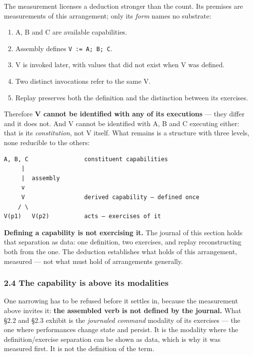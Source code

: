 \documentclass[
]{article}
\newcounter{none} %
\providecommand{\tightlist}{%
  \setlength{\itemsep}{0pt}\setlength{\parskip}{0pt}}
\begin{document}
The measurement licenses a deduction stronger than the count. Its
premises are measurements of this arrangement; only its \emph{form}
names no substrate:

\begin{enumerate}
\def\labelenumi{\arabic{enumi}.}
\tightlist
\item
  A, B and C are available capabilities.
\item
  Assembly defines \texttt{V\ :=\ A;\ B;\ C}.
\item
  V is invoked later, with values that did not exist when V was defined.
\item
  Two distinct invocations refer to the same V.
\item
  Replay preserves both the definition and the distinction between its
  exercises.
\end{enumerate}

Therefore \textbf{V cannot be identified with any of its executions} ---
they differ and it does not. And V cannot be identified with A, B and C
executing either: that is its \emph{constitution}, not V itself. What
remains is a structure with three levels, none reducible to the others:

\begin{verbatim}
A, B, C                constituent capabilities
     |
     |  assembly
     v
     V                 derived capability — defined once
    / \
V(p1)   V(p2)          acts — exercises of it
\end{verbatim}

\textbf{Defining a capability is not exercising it.} The journal of this
section holds that separation as data: one definition, two exercises,
and replay reconstructing both from the one. The deduction establishes
what holds of this arrangement, measured --- not what must hold of
arrangements generally.

\subsubsection{2.4 The capability is above its
modalities}\label{the-capability-is-above-its-modalities}

One narrowing has to be refused before it settles in, because the
measurement above invites it: \textbf{the assembled verb is not defined
by the journal.} What §2.2 and §2.3 exhibit is the \emph{journaled
command} modality of its exercises --- the one where performances change
state and persist. It is the modality where the definition/exercise
separation can be shown as data, which is why it was measured first. It
is not the definition of the term.
\end{document}
